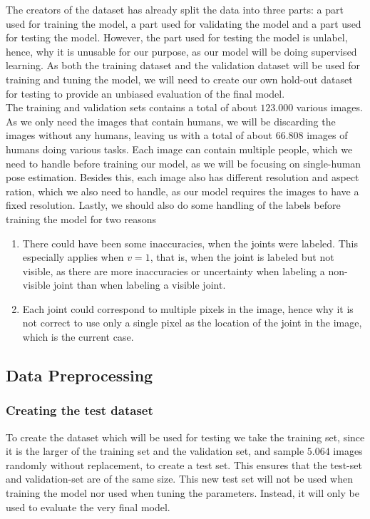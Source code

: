 \documentclass[main.tex]{subfiles}
\begin{document}
The creators of the dataset has already split the data into three parts: a part used for training the model, a part used for validating the model and a part used for testing the model. However, the part used for testing the model is unlabel, hence, why it is unusable for our purpose, as our model will be doing supervised learning. As both the training dataset and the validation dataset will be used for training and tuning the model, we will need to create our own hold-out dataset for testing to provide an unbiased evaluation of the final model. \\
The training and validation sets contains a total of about $123.000$ various images. As we only need the images that contain humans, we will be discarding the images without any humans, leaving us with a total of about $66.808$ images of humans doing various tasks. Each image can contain multiple people, which we need to handle before training our model, as we will be focusing on single-human pose estimation. Besides this, each image also has different resolution and aspect ration, which we also need to handle, as our model requires the images to have a fixed resolution. Lastly, we should also do some handling of the labels before training the model for two reasons
\begin{enumerate}
    \item There could have been some inaccuracies, when the joints were labeled. This especially applies when $v = 1$, that is, when the joint is labeled but not visible, as there are more inaccuracies or uncertainty when labeling a non-visible joint than when labeling a visible joint.
    \item Each joint could correspond to multiple pixels in the image, hence why it is not correct to use only a single pixel as the location of the joint in the image, which is the current case.
\end{enumerate}

\subsection{Data Preprocessing}
\subsubsection{Creating the test dataset}
To create the dataset which will be used for testing we take the training set, since it is the larger of the training set and the validation set, and sample $5.064$ images randomly without replacement, to create a test set. This ensures that the test-set and validation-set are of the same size. This new test set will not be used when training the model nor used when tuning the parameters. Instead, it will only be used to evaluate the very final model. 
\end{document}
